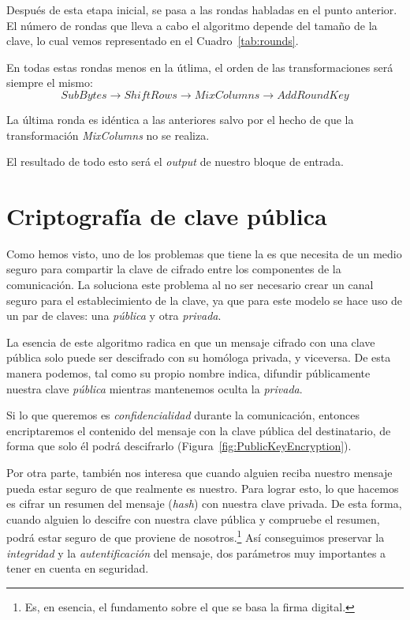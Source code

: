  Después de esta etapa inicial, se pasa a las rondas habladas en el punto anterior.
 El número de rondas que lleva a cabo el algoritmo depende del tamaño de la clave,
 lo cual vemos representado en el Cuadro~\ref{tab:rounds}.

 En todas estas rondas menos en la útlima, el orden de las transformaciones será siempre el mismo:
 \[ SubBytes \rightarrow ShiftRows \rightarrow MixColumns \rightarrow AddRoundKey \]

 La última ronda es idéntica a las anteriores salvo por el hecho de que la transformación \emph{MixColumns} no se realiza.

 El resultado de todo esto será el \emph{output} de nuestro bloque de entrada. \emph{\parencite{Reference26}}


 \section{Criptografía de clave pública}

 Como hemos visto, uno de los problemas que tiene la  es que necesita de un medio seguro para compartir la clave de cifrado entre los componentes de la comunicación.
 La  soluciona este problema al no ser necesario crear un canal seguro para el establecimiento de la clave, ya que para este modelo se hace uso de un par de claves: una \emph{pública} y otra \emph{privada}.

 La esencia de este algoritmo radica en que un mensaje cifrado con una clave pública solo puede ser descifrado con su homóloga privada, y viceversa.
 De esta manera podemos, tal como su propio nombre indica, difundir públicamente nuestra clave \emph{pública} mientras mantenemos oculta la \emph{privada}.

 Si lo que queremos es \emph{confidencialidad} durante la comunicación, entonces encriptaremos el contenido del mensaje con la clave pública del destinatario, de forma que solo él podrá descifrarlo (Figura~\ref{fig:PublicKeyEncryption}).

 Por otra parte, también nos interesa que cuando alguien reciba nuestro mensaje pueda estar seguro de que realmente es nuestro.
 Para lograr esto, lo que hacemos es cifrar un resumen del mensaje (\emph{hash}) con nuestra clave privada.
 De esta forma, cuando alguien lo descifre con nuestra clave pública y compruebe el resumen, podrá estar seguro de que proviene de nosotros.\footnote{Es, en esencia, el fundamento sobre el que se basa la firma digital.}
 Así conseguimos preservar la \emph{integridad} y la \emph{autentificación} del mensaje, dos parámetros muy importantes a tener en cuenta en seguridad. \emph{\parencite{Reference14}}

